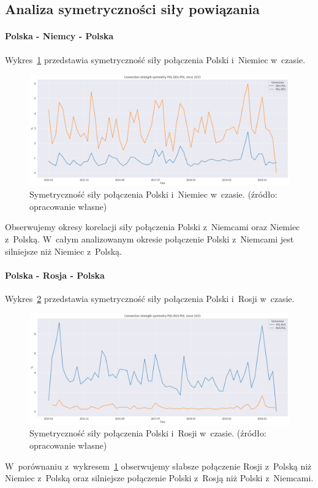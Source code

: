 \documentclass[11pt]{report}
\begin{document}
    \subsection{Analiza symetryczności siły powiązania}

    \paragraph{Polska - Niemcy - Polska}

    Wykres~\ref{fig:POL-DEU-POL} przedstawia symetryczność siły połączenia Polski i~Niemiec w~czasie.
    \begin{figure}[!htp]
        \centering
        \includegraphics[width=\linewidth]{fig/ConnectionSymmetry/POL-DEU-POL.png}
        \caption{Symetryczność siły połączenia Polski i~Niemiec w~czasie. (źródło: opracowanie własne)}
        \label{fig:POL-DEU-POL}
    \end{figure}
    Obserwujemy okresy korelacji siły połączenia Polski z~Niemcami oraz Niemiec z~Polską.
    W~całym analizowanym okresie połączenie Polski z~Niemcami jest silniejsze niż Niemiec z~Polską.

    \paragraph{Polska - Rosja - Polska}

    Wykres~\ref{fig:POL-RUS-POL} przedstawia symetryczność siły połączenia Polski i~Rosji w~czasie.
    \begin{figure}[!htp]
        \centering
        \includegraphics[width=\linewidth]{fig/ConnectionSymmetry/POL-RUS-POL.png}
        \caption{Symetryczność siły połączenia Polski i~Rosji w~czasie. (źródło: opracowanie własne)}
        \label{fig:POL-RUS-POL}
    \end{figure}
    W~porównaniu z~wykresem~\ref{fig:POL-DEU-POL} obserwujemy słabsze połączenie Rosji z~Polską niż Niemiec z~Polską oraz silniejsze połączenie Polski z~Rosją niż Polski z~Niemcami.
\end{document}
